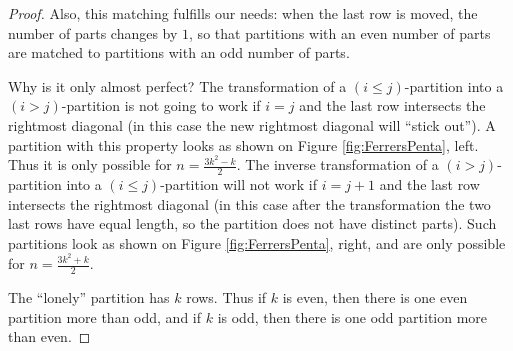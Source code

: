 \begin{page}
\begin{proof}
Also, this matching fulfills our needs: when the last row is moved, the number of parts changes by $1$,
so that partitions with an even number of parts are matched to partitions with an odd number of parts.

Why is it only almost perfect?
The transformation of a $(i \le j)$-partition into a $(i > j)$-partition is not going to work if $i=j$ and the last row intersects the rightmost diagonal
(in this case the new rightmost diagonal will ``stick out'').
A partition with this property looks as shown on Figure \ref{fig:FerrersPenta}, left.
Thus it is only possible for $n = \frac{3k^2 - k}2$.
The inverse transformation of a $(i > j)$-partition into a $(i \le j)$-partition will not work
if $i = j+1$ and the last row intersects the rightmost diagonal
(in this case after the transformation the two last rows have equal length, so the partition does not have distinct parts).
Such partitions look as shown on Figure \ref{fig:FerrersPenta}, right, and are only possible for $n = \frac{3k^2 + k}2$.

The ``lonely'' partition has $k$ rows.
Thus if $k$ is even, then there is one even partition more than odd,
and if $k$ is odd, then there is one odd partition more than even.
\end{proof}






\end{page}

